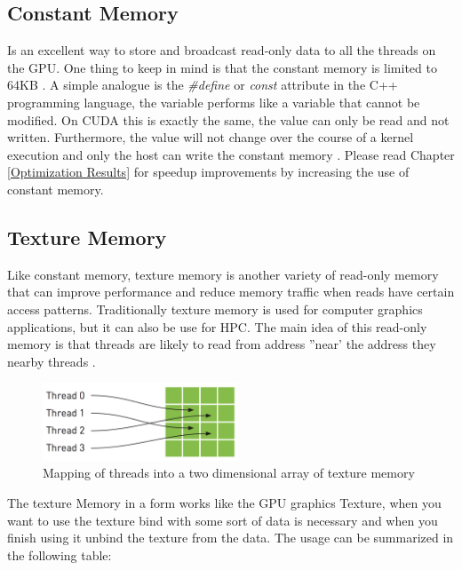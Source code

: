    
\subsection{Constant Memory}

Is an excellent way to store and broadcast read-only data to all the threads on the GPU. One thing to keep in mind is that the constant memory is limited to 64KB \cite{design}. A simple analogue is the \textit{\#define} or \textit{const} attribute in the C++ programming language, the variable performs like a variable that cannot be modified. On CUDA this is exactly the same, the value can only be read and not written. Furthermore, the value will not change over the course of a kernel execution and only the host can write the constant memory \cite{example}. Please read Chapter \ref{Optimization Results} for speedup improvements by increasing the use of constant memory.

\subsection{Texture Memory}

Like constant memory, texture memory is another variety of read-only memory that can improve performance and reduce memory traffic when reads have certain access patterns. Traditionally texture memory is used for computer graphics applications, but it can also be use for HPC. The main idea of this read-only memory is that threads are likely to read from address ''near' the address they nearby threads \cite{example}.

\begin{figure}[htbp]
	\centering
		\includegraphics[width=0.52\textwidth]{Figures/texture.png}
		\smallskip
	\caption[Texture Memory]{Mapping of threads into a two dimensional array of texture memory \cite{hwu}}
	\label{fig:texture}
\end{figure}

The texture Memory in a form works like the GPU graphics Texture, when you want to use the texture bind with some sort of data is necessary and when you finish using it unbind the texture from the data. The usage can be summarized in the following table:

